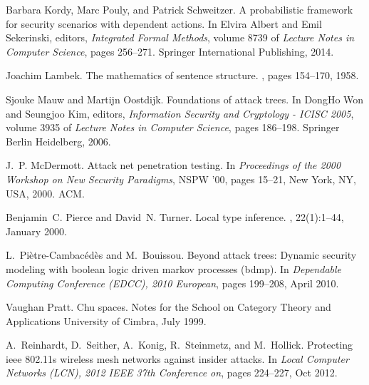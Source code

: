 \documentclass{sigplanconf}
\begin{document}
\begin{thebibliography}{10}
Barbara Kordy, Marc Pouly, and Patrick Schweitzer.
\newblock A probabilistic framework for security scenarios with dependent
  actions.
\newblock In Elvira Albert and Emil Sekerinski, editors, {\em Integrated Formal
  Methods}, volume 8739 of {\em Lecture Notes in Computer Science}, pages
  256--271. Springer International Publishing, 2014.

Joachim Lambek.
\newblock The mathematics of sentence structure.
, pages 154--170, 1958.  
  
Sjouke Mauw and Martijn Oostdijk.
\newblock Foundations of attack trees.
\newblock In DongHo Won and Seungjoo Kim, editors, {\em Information Security
  and Cryptology - ICISC 2005}, volume 3935 of {\em Lecture Notes in Computer
  Science}, pages 186--198. Springer Berlin Heidelberg, 2006.

J.~P. McDermott.
\newblock Attack net penetration testing.
\newblock In {\em Proceedings of the 2000 Workshop on New Security Paradigms},
  NSPW '00, pages 15--21, New York, NY, USA, 2000. ACM.

Benjamin~C. Pierce and David~N. Turner.
\newblock Local type inference.
, 22(1):1--44, January 2000.

L.~Pi{\`e}tre-Cambac{\'e}d{\`e}s and M.~Bouissou.
\newblock Beyond attack trees: Dynamic security modeling with boolean logic
  driven markov processes (bdmp).
\newblock In {\em Dependable Computing Conference (EDCC), 2010 European}, pages
  199--208, April 2010.

Vaughan Pratt.
\newblock Chu spaces.
\newblock Notes for the School on Category Theory and Applications University
  of Cimbra, July 1999.

A.~Reinhardt, D.~Seither, A.~Konig, R.~Steinmetz, and M.~Hollick.
\newblock Protecting ieee 802.11s wireless mesh networks against insider
  attacks.
\newblock In {\em Local Computer Networks (LCN), 2012 IEEE 37th Conference on},
  pages 224--227, Oct 2012.


\end{thebibliography}
\end{document}
